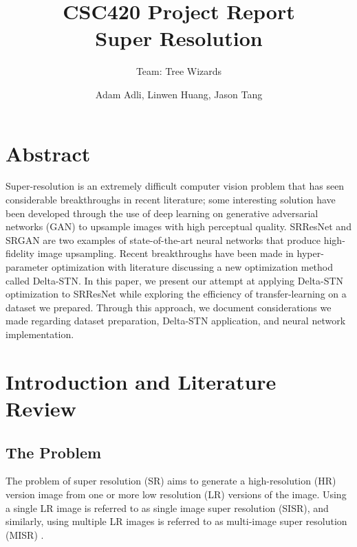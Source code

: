 \documentclass[11pt,titlepage]{article}
\title{CSC420 Project Report \\ Super Resolution}
\author{Team: Tree Wizards}
\date{Adam Adli, Linwen Huang, Jason Tang}
\begin{document}
\maketitle

\section*{Abstract}

Super-resolution is an extremely difficult computer vision problem that has seen considerable breakthroughs in recent literature; some interesting solution have been developed through the use of deep learning on generative adversarial networks (GAN) to upsample images with high perceptual quality. SRResNet and SRGAN are two examples of state-of-the-art neural networks that produce high-fidelity image upsampling. Recent breakthroughs have been made in hyper-parameter optimization with literature discussing a new optimization method called Delta-STN. In this paper, we present our attempt at applying Delta-STN optimization to SRResNet while exploring the efficiency of transfer-learning on a dataset we prepared. Through this approach, we document considerations we made regarding dataset preparation, Delta-STN application, and neural network implementation.

\section*{Introduction and Literature Review}
\subsection*{The Problem}
The problem of super resolution (SR) aims to generate a high-resolution (HR) version image from one or more low resolution (LR) versions of the image. Using a single LR image is referred to as single image super resolution (SISR), and similarly, using multiple LR images is referred to as multi-image super resolution (MISR) \cite{Yang2019}.

\bigskip
\end{document}
